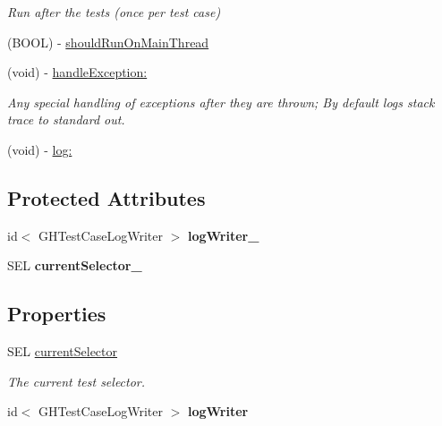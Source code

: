 \begin{DoxyCompactItemize}
\begin{DoxyCompactList}\small\item\em \-Run after the tests (once per test case) \end{DoxyCompactList}\item 
(\-B\-O\-O\-L) -\/ \hyperlink{interface_g_h_test_case_a08b9bcb2d874b7785918457257446066}{should\-Run\-On\-Main\-Thread}
\item 
\hypertarget{interface_g_h_test_case_a2d3628a89e080f97c76e2d4cb08acce0}{
(void) -\/ \hyperlink{interface_g_h_test_case_a2d3628a89e080f97c76e2d4cb08acce0}{handle\-Exception\-:}}
\label{interface_g_h_test_case_a2d3628a89e080f97c76e2d4cb08acce0}

\begin{DoxyCompactList}\small\item\em \-Any special handling of exceptions after they are thrown; \-By default logs stack trace to standard out. \end{DoxyCompactList}\item 
(void) -\/ \hyperlink{interface_g_h_test_case_a432eee57d9d2fd6cf5fc47c5aac123bc}{log\-:}
\end{DoxyCompactItemize}
\subsection*{\-Protected \-Attributes}
\begin{DoxyCompactItemize}
\item 
\hypertarget{interface_g_h_test_case_a60d94133d7409df18b5cf66027a5211a}{
id$<$ \-G\-H\-Test\-Case\-Log\-Writer $>$ {\bfseries log\-Writer\-\_\-}}
\label{interface_g_h_test_case_a60d94133d7409df18b5cf66027a5211a}

\item 
\hypertarget{interface_g_h_test_case_ae5eb881a2b3ca88b08323159399aa186}{
\-S\-E\-L {\bfseries current\-Selector\-\_\-}}
\label{interface_g_h_test_case_ae5eb881a2b3ca88b08323159399aa186}

\end{DoxyCompactItemize}
\subsection*{\-Properties}
\begin{DoxyCompactItemize}
\item 
\hypertarget{interface_g_h_test_case_ab7b5392c2af1798ca379c4de5207c18a}{
\-S\-E\-L \hyperlink{interface_g_h_test_case_ab7b5392c2af1798ca379c4de5207c18a}{current\-Selector}}
\label{interface_g_h_test_case_ab7b5392c2af1798ca379c4de5207c18a}

\begin{DoxyCompactList}\small\item\em \-The current test selector. \end{DoxyCompactList}\item 
\hypertarget{interface_g_h_test_case_af9d60476ddb5d807f6f0395b63dfb8d9}{
id$<$ \-G\-H\-Test\-Case\-Log\-Writer $>$ {\bfseries log\-Writer}}
\label{interface_g_h_test_case_af9d60476ddb5d807f6f0395b63dfb8d9}

\end{DoxyCompactItemize}


